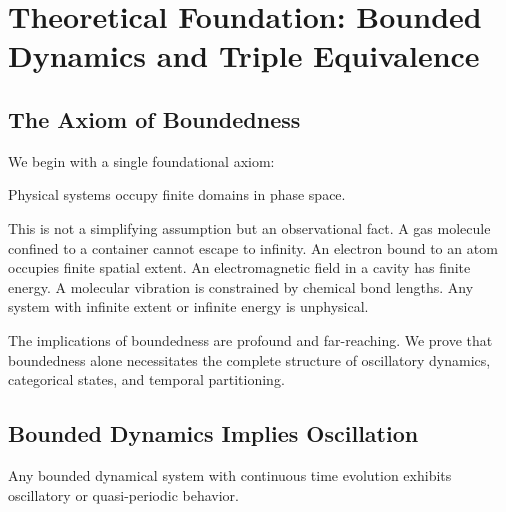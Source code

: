 \section{Theoretical Foundation: Bounded Dynamics and Triple Equivalence}
\label{sec:foundation}

\subsection{The Axiom of Boundedness}

We begin with a single foundational axiom:

\begin{axiom}[Boundedness]
\label{ax:bounded}
Physical systems occupy finite domains in phase space.
\end{axiom}

This is not a simplifying assumption but an observational fact. A gas molecule confined to a container cannot escape to infinity. An electron bound to an atom occupies finite spatial extent. An electromagnetic field in a cavity has finite energy. A molecular vibration is constrained by chemical bond lengths. Any system with infinite extent or infinite energy is unphysical.

The implications of boundedness are profound and far-reaching. We prove that boundedness alone necessitates the complete structure of oscillatory dynamics, categorical states, and temporal partitioning.

\subsection{Bounded Dynamics Implies Oscillation}

\begin{proposition}
\label{prop:oscillation}
Any bounded dynamical system with continuous time evolution exhibits oscillatory or quasi-periodic behavior.
\end{proposition}


